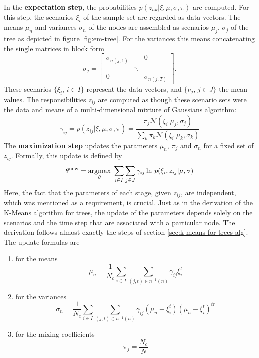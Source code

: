 In the \textbf{expectation step}, the probabilities $p(z_{nk}|\xi, \mu,\sigma,\pi)$ are computed.
For this step, the scenarios $\xi_i$ of the sample set are regarded as data vectors.
The means $\mu_n$ and variances $\sigma_n$ of the nodes are assembled as scenarios $\mu_j$, $\sigma_j$ of the tree as depicted in figure \ref{fig:em-tree}.
For the variances this means concatenating the single matrices in block form
\begin{equation}
  \label{eq:58}
  \sigma_j = \left[\begin{array}{ccc}\sigma_{n(j,1)}&&0\\ &\ddots\\ 0&&\sigma_{n(j,T)}\end{array} \right].
\end{equation}
These scenarios $\{\xi_i,\, i\in I\}$ represent the data vectors, and $\{\nu_j,\, j\in J\}$ the mean values.
The responsibilities $z_{ij}$ are computed as though these scenario sets were the data and means of a multi-dimensional mixture of Gaussians algorithm:
\begin{equation}
  \label{eq:57}
  \gamma_{ij} = p(z_{ij}|\xi, \mu,\sigma,\pi) = \frac{\pi_j\mathcal{N}(\xi_i|\mu_j, \sigma_j)}{\sum_k\pi_k\mathcal{N}(\xi_i|\mu_k,\sigma_k)}
\end{equation}
The \textbf{maximization step} updates the parameters $\mu_n$, $\pi_j$ and $\sigma_n$ for a fixed set of $z_{ij}$.
Formally, this update is defined by
\begin{equation}
  \label{eq:59}
  \theta^{\mathrm{new}} = \underset{\theta}{\operatorname{argmax}}\; \sum_{i\in I}\sum_{j\in J}\gamma_{ij}\ln\,p(\xi_i,z_{ij}|\mu, \sigma)
\end{equation}
Here, the fact that the parameters of each stage, given $z_{ij}$, are independent, which was mentioned as a requirement, is crucial.
Just as in the derivation of the K-Means algorithm for trees, the update of the parameters depends solely on the scenarios and the time step that are associated with a particular node.
The derivation follows almost exactly the steps of section \ref{sec:k-means-for-trees-alg}.
The update formulas are
\begin{enumerate}
\item for the means
  \begin{equation}
    \label{eq:61}
    \mu_n = \frac{1}{N_c}\sum_{i\in I}\sum_{(j,t)\in n^{-1}(n)} \gamma_{ij}\xi_i^t
  \end{equation}
\item for the variances
  \begin{equation}
    \label{eq:62}
    \sigma_n = \frac{1}{N_c}\sum_{i\in I}\sum_{(j,t)\in n^{-1}(n)} \gamma_{ij}(\mu_n-\xi_i^t)(\mu_n-\xi_i^t)^{tr}
  \end{equation}
  \item for the mixing coefficients
    \begin{equation}
      \label{eq:63}
      \pi_j = \frac{N_c}{N}
    \end{equation}
\end{enumerate}

